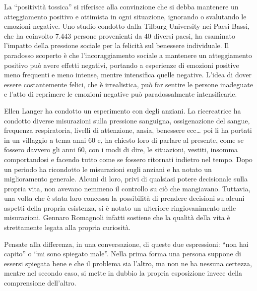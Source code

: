 \documentclass[12pt]{book} %
\begin{document}
La “positività tossica” si riferisce alla convinzione che si debba mantenere un atteggiamento positivo e ottimista in ogni situazione, ignorando o svalutando le emozioni negative. Uno studio condotto dalla Tilburg University nei Paesi Bassi, che ha coinvolto 7.443 persone provenienti da 40 diversi paesi, ha esaminato l’impatto della pressione sociale per la felicità sul benessere individuale.
Il paradosso scoperto è che l’incoraggiamento sociale a mantenere un atteggiamento positivo può avere effetti negativi, portando a esperienze di emozioni positive meno frequenti e meno intense, mentre intensifica quelle negative. L’idea di dover essere costantemente felici, che è irrealistica, può far sentire le persone inadeguate e l’atto di reprimere le emozioni negative può paradossalmente intensificarle.

Ellen Langer ha condotto un esperimento con degli anziani. La ricercatrice ha condotto diverse misurazioni sulla
pressione sanguigna, ossigenazione del sangue, frequenza respiratoria, livelli di attenzione, ansia, benessere ecc…
poi li ha portati in un villaggio a tema anni 60 e, ha chiesto loro di parlare al presente, come se fossero davvero gli
anni 60, con i modi di dire, le situazioni, vestiti, insomma comportandosi e facendo tutto come se fossero ritornati
indietro nel tempo. Dopo un periodo ha ricondotto le misurazioni sugli anziani e ha notato un miglioramento generale.
Alcuni di loro, privi di qualsiasi potere decisionale sulla propria vita, non avevano nemmeno il controllo su ciò che
mangiavano. Tuttavia, una volta che è stata loro concessa la possibilità di prendere decisioni su alcuni aspetti della
propria esistenza, si è notato un ulteriore ringiovanimento nelle misurazioni. Gennaro Romagnoli infatti sostiene che
la qualità della vita è strettamente legata alla propria
curiosità.

Pensate alla differenza, in una conversazione, di queste due espressioni: “non hai capito” o “mi sono spiegato male”.
Nella prima forma una persona suppone di essersi spiegata bene e che il problema sia l'altro, ma non ne ha nessuna
certezza, mentre nel secondo caso, si mette in dubbio la propria esposizione invece della comprensione dell'altro.
\end{document}
